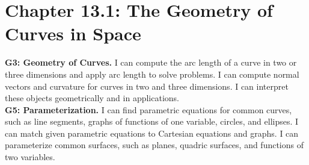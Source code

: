 \fancyhead[R]{\dayfour}

\section*{\centering Chapter 13.1: The Geometry of Curves in Space}
\textbf{G3: Geometry of Curves.} I can compute the arc length of a curve in two or three dimensions and apply arc length to solve problems. I can compute normal vectors and curvature for curves in two and three dimensions.  I can interpret these objects geometrically and in applications.\\

\textbf{G5: Parameterization.} I can find parametric equations for common curves, such as line segments, graphs of functions of one variable, circles, and ellipses.  I can match given parametric equations to Cartesian equations and graphs. I can parameterize common surfaces, such as planes, quadric surfaces, and functions of two variables.

